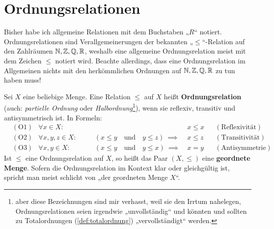 \section{Ordnungsrelationen}


\begin{nota}
    Bisher habe ich allgemeine Relationen mit dem Buchstaben „$R$“ notiert. Ordnungsrelationen sind Verallgemeinerungen der bekannten „$\le$“-Relation auf den Zahlräumen $\mathbb N,\mathbb Z,\mathbb Q,\mathbb R$, weshalb eine allgemeine Ordnungsrelation meist mit dem Zeichen $\le$ notiert wird. Beachte allerdings, dass eine Ordnungsrelation im Allgemeinen nichts mit den herkömmlichen Ordnungen auf $\mathbb N,\mathbb Z,\mathbb Q,\mathbb R$ zu tun haben muss!
\end{nota}


\begin{defin}[Ordnungsrelationen] \label{def:ordnungsrelation}    
    Sei $X$ eine beliebige Menge. Eine Relation $\le$ auf $X$ heißt \textbf{Ordnungsrelation} (auch: \emph{partielle Ordnung} oder \emph{Halbordnung}\footnote{aber diese Bezeichnungen sind mir verhasst, weil sie den Irrtum nahelegen, Ordnungsrelationen seien irgendwie „unvollständig“ und könnten und sollten zu Totalordnungen (\cref{def:totalordnung}) „vervollständigt“ werden.}), wenn sie reflexiv, transitiv und antisymmetrisch ist. In Formeln:
    \begin{align*}
        & (\text{O1}) & \forall x\in X:&&\quad &x\le x && (\text{Reflexivität}) \\
        & (\text{O2}) & \forall x,y,z\in X:&&\quad (x\le y\quad \text{und}\quad y\le z)\ \implies\ & x\le z && (\text{Transitivität}) \\
        & (\text{O3}) & \forall x,y\in X:&&\quad  (x\le y\quad \text{und}\quad y\le x)\ \implies\ & x=y && (\text{Antisymmetrie})
    \end{align*}
    Ist $\le$ eine Ordnungsrelation auf $X$, so heißt das Paar $(X,\le)$ eine \textbf{geordnete Menge}. Sofern die Ordnungsrelation im Kontext klar oder gleichgültig ist, spricht man meist schlicht von „der geordneten Menge $X$“.
\end{defin}



